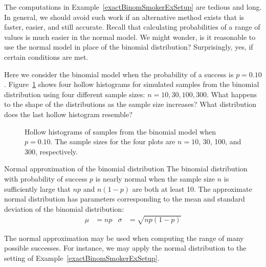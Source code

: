 The computations in Example~\ref{exactBinomSmokerExSetup}
are tedious and long.
In general, we should avoid such work if an alternative method
exists that is faster, easier, and still accurate.
Recall that calculating probabilities of a range of values
is much easier in the normal model.
We might wonder, is it reasonable to use the normal model
in place of the binomial distribution?
Surprisingly, yes, if certain conditions are met.

\begin{exercisewrap}
\begin{nexercise}
Here we consider the binomial model when the probability
of a success is $p = 0.10$.
Figure~\ref{fourBinomialModelsShowingApproxToNormal}
shows four hollow histograms for simulated samples from
the binomial distribution using four different sample sizes:
$n = 10, 30, 100, 300$.
What happens to the shape of the distributions as the sample
size increases?
What distribution does the last hollow histogram
resemble?\footnotemark{}
\end{nexercise}
\end{exercisewrap}

\begin{figure}[h]
  \centering
  \caption{Hollow histograms of samples from the binomial
      model when $p = 0.10$.
      The sample sizes for the four plots are
      $n = 10$, 30, 100, and 300, respectively.}
  \label{fourBinomialModelsShowingApproxToNormal}
\end{figure}

\begin{onebox}{Normal approximation of the binomial distribution}
  The binomial distribution with probability of success
  $p$ is nearly normal when the sample size $n$ is
  sufficiently large that $np$ and $n(1-p)$ are both
  at least 10.
  The approximate normal distribution has parameters
  corresponding to the mean and standard deviation of
  the binomial distribution:\vspace{-1.5mm}
  \begin{align*}
  \mu &= np
      &\sigma& = \sqrt{np(1 - p)}
  \end{align*}
\end{onebox}

The normal approximation may be used when computing
the range of many possible successes.
For instance, we may apply the normal distribution to
the setting of Example~\ref{exactBinomSmokerExSetup}.

